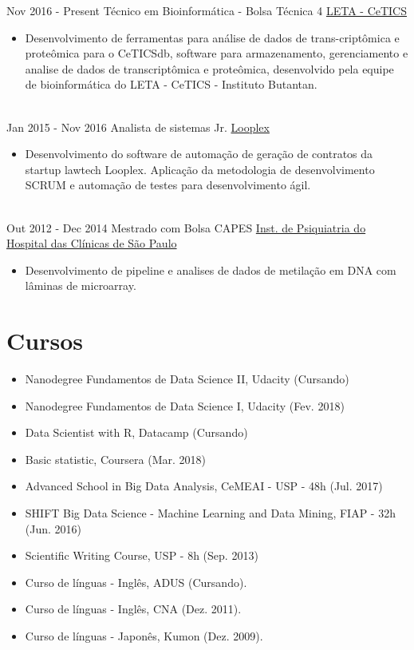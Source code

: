 \documentclass[letterpaper]{twentysecondcv} %
\begin{document}
\begin{twenty} %
\twentyitem
    	{Nov 2016 - }
		{Present}
        {Técnico em Bioinformática - Bolsa Técnica 4}
        {\href{http://cetics.butantan.gov.br/}{LETA - CeTICS}}
        {}
        {\begin{itemize}
        \item Desenvolvimento de ferramentas para análise de dados de trans-criptômica e proteômica para o CeTICSdb, software para armazenamento, gerenciamento e analise de dados de transcriptômica e proteômica, desenvolvido pela equipe de bioinformática do LETA - CeTICS - Instituto Butantan.
        \end{itemize}}
        \\
	\twentyitem
    	{Jan 2015 - }
		{Nov 2016}
        {Analista de sistemas Jr.}
        {\href{www.looplex.com.br/}{Looplex}}
        {}
        {
        {\begin{itemize}
        \item Desenvolvimento do software de automação de geração de contratos da startup lawtech Looplex. Aplicação da metodologia de desenvolvimento SCRUM e automação de testes para desenvolvimento ágil.
    \end{itemize}}
        }
    \\   
    \twentyitem
   		{Out 2012 - }
		{Dec 2014}
        {Mestrado com Bolsa CAPES }
        {\href{www.ipqhc.org.br}{ Inst. de Psiquiatria do Hospital das Clínicas de São Paulo}}
        {}
        {
        {\begin{itemize}
        \item Desenvolvimento de pipeline e analises de dados de metilação em DNA com lâminas de microarray.
    \end{itemize}}
        }       
\end{twenty}

\section{Cursos}
\begin{itemize}
	\item Nanodegree Fundamentos de Data Science II, Udacity (Cursando)
	\item Nanodegree Fundamentos de Data Science I, Udacity (Fev. 2018)
	\item Data Scientist with R, Datacamp (Cursando) 
	\item Basic statistic, Coursera (Mar. 2018)
	\item Advanced School in Big Data Analysis, CeMEAI - USP - 48h (Jul. 2017)
	\item SHIFT Big Data Science - Machine Learning and Data Mining, FIAP - 32h (Jun. 2016)
	\item Scientific Writing Course, USP - 8h (Sep. 2013)
	\item Curso de línguas - Inglês, ADUS (Cursando).
	\item Curso de línguas - Inglês, CNA (Dez. 2011).
	\item Curso de línguas - Japonês, Kumon (Dez. 2009).
\end{itemize}
\end{document}
